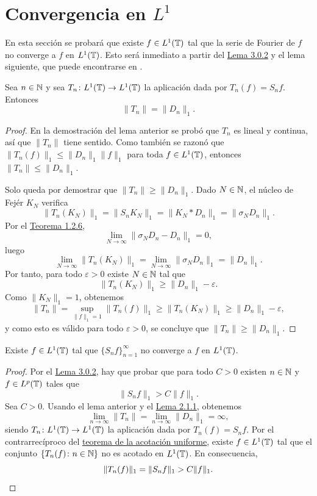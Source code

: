 \documentclass[a4paper, 12pt, oneside]{book}
\begin{document}
\section[Convergencia en \texorpdfstring{$L^1$}{L1}]{Convergencia en \texorpdfstring{\boldmath$L^1$}{L1}}

En esta sección se probará que existe $f \in L^1(\mathbb T)$ tal que la serie de Fourier de $f$ no converge a $f$ en $L^1(\mathbb T)$. Esto será inmediato a partir del \hyperref[3.0.2]{\color{blue}Lema 3.0.2} y el lema siguiente, que puede encontrarse en \cite{katznelson}.

\begin{lemma}
    Sea $n \in \mathbb N$ y sea $T_n \colon L^1(\mathbb T) \to L^1(\mathbb T)$ la aplicación dada por $T_n(f) = S_nf$. Entonces
    \[\|T_n\| = \|D_n\|_1.\]
\end{lemma}

\begin{proof}
    En la demostración del lema anterior se probó que $T_n$ es lineal y continua, así que $\|T_n\|$ tiene sentido. Como también se razonó que $\|T_n(f)\|_1 \leq \|D_n\|_1\|f\|_1$ para toda $f \in L^1(\mathbb T)$, entonces $\|T_n\| \leq \|D_n\|_1$. 
    
    Solo queda por demostrar que $\|T_n\|\geq \|D_n\|_1$. Dado $N \in \mathbb N$, el núcleo de Fejér $K_N$ verifica
    \[\|T_n(K_N)\|_1 = \|S_nK_N\|_1 = \|K_N \ast D_n\|_1 = \|\sigma_ND_n\|_1.\]
    Por el \hyperref[1.2.6]{\color{blue}Teorema 1.2.6},
    \[\lim_{N\to\infty} \|\sigma_ND_n-D_n\|_1 = 0,\]
    luego
    \[\lim_{N\to\infty} \|T_n(K_N)\|_1 = \lim_{N\to\infty} \|\sigma_ND_n\|_1 = \|D_n\|_1.\]
    Por tanto, para todo $\varepsilon > 0$ existe $N \in \mathbb N$ tal que 
    \[\|T_n(K_{N})\|_1 \geq \|D_n\|_1-\varepsilon.\]
    Como $\|K_N\|_1=1$, obtenemos
    \[\|T_n\| = \sup_{\|f\|_1=1} \|T_n(f)\|_1 \geq \|T_n(K_N)\|_1 \geq \|D_n\|_1-\varepsilon,\]
    y como esto es válido para todo $\varepsilon>0$, se concluye que $\|T_n\| \geq \|D_n\|_1$.
\end{proof}

\begin{theorem}
    Existe $f \in L^1(\mathbb T)$ tal que $\{S_nf\}_{n=1}^\infty$ no converge a $f$ en $L^1(\mathbb T)$.
\end{theorem}

\begin{proof}
    Por el \hyperref[3.0.2]{\color{blue}Lema 3.0.2}, hay que probar que para todo $C > 0$ existen $n \in \mathbb N$ y $f \in L^p(\mathbb T)$ tales que
    \[\|S_nf\|_1 > C\|f\|_1.\]
    Sea $C>0$. Usando el lema anterior y el \hyperref[2.1.1]{\color{blue}Lema 2.1.1}, obtenemos
    \[\lim_{n\to\infty} \|T_n\| = \lim_{n\to\infty}\|D_n\|_1 = \infty,\]
    siendo $T_n \colon L^1(\mathbb T) \to L^1(\mathbb T)$ la aplicación dada por $T_n(f) = S_nf$. Por el contrarrecíproco del \hyperref[1.3.1]{\color{blue}teorema de la acotación uniforme}, existe $f \in L^1(\mathbb T)$ tal que el conjunto $\{T_n(f) \colon n \in \mathbb N\}$ no es acotado en $L^1(\mathbb T)$. En consecuencia,
    \[\|T_n(f)\|_1 = \|S_nf\|_1 > C\|f\|_1. \qedhere\]
\end{proof}
\end{document}

